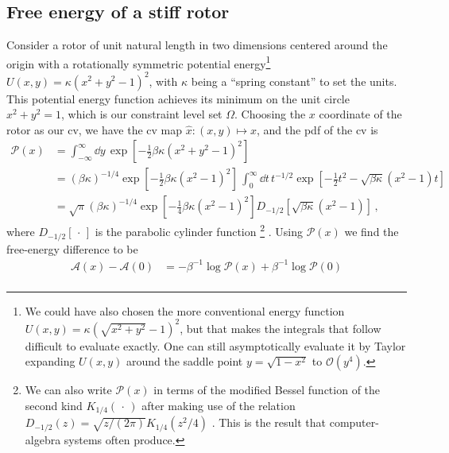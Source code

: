 \begin{subappendices}
\label{sub:subsection name}

\subsection*{Free energy of a stiff rotor}

Consider a rotor of unit natural length in two dimensions centered around the origin with a rotationally symmetric potential energy\footnote{We could have also chosen the more conventional energy function $U(x, y) = \kappa(\sqrt{x^2 + y^2} - 1)^2$, but that makes the integrals that follow difficult to evaluate exactly.  One can still asymptotically evaluate it by Taylor expanding $U(x, y)$ around the saddle point $y = \sqrt{1 - x^2}$ to $\mathcal{O}(y^4)$.} $U(x, y) = \kappa(x^2 + y^2 - 1)^2$, with $\kappa$ being a ``spring constant'' to set the units.
This potential energy function achieves its minimum on the unit circle $x^2 + y^2 = 1$, which is our constraint level set $\Omega$.
Choosing the $x$ coordinate of the rotor as our \ac{cv}, we have the \ac{cv} map $\hat{x}: (x,y) \mapsto x$, and the \ac{pdf} of the \ac{cv} is
%
\begin{equation}
  \begin{aligned}
    \mathscr{P}(x) &= \int_{-\infty}^{\infty} \dd{y}\, \exp\left[-\tfrac{1}{2}\beta\kappa(x^2 + y^2 - 1)^2\right]\\
                             &= (\beta\kappa)^{-1/4}\exp\left[-\tfrac{1}{2}\beta\kappa(x^2 - 1)^2\right]\,\int_{0}^{\infty} \dd{t}\,t^{-1/2}\exp\left[-\tfrac{1}{2}t^2 - \sqrt{\beta\kappa}(x^2 - 1)t\right]\\
                             &= \sqrt{\pi}(\beta\kappa)^{-1/4}\exp\left[-\tfrac{1}{4}\beta\kappa(x^2 - 1)^2\right]D_{-1/2}\left[\sqrt{\beta\kappa}(x^2 - 1)\right]\,,
                             \label{eq:rotor_pdf}
  \end{aligned}
\end{equation}
%
where $D_{-1/2}[\,\cdot\,]$ is the parabolic cylinder function%
\footnote{We can also write $\mathscr{P}(x)$ in terms of the modified Bessel function of the second kind $K_{1/4}(\,\cdot\,)$ after making use of the relation $D_{-1/2}(z) = \sqrt{z/(2\pi)}K_{1/4}(z^2/4)$ \cite[Eq.~12.7.10]{olver2010}.
This is the result that computer-algebra systems often produce.} \cite[Eq.~12.5.1]{olver2010}.
Using $\mathscr{P}(x)$ we find the free-energy difference to be
\begin{equation}
\begin{aligned}\label{eq:rotor_exact_a}
  \mathscr{A}(x) - \mathscr{A}(0) &= -\beta^{-1}\log{\mathscr{P}(x)} +\beta^{-1}\log{\mathscr{P}(0)}\\

\end{aligned}
\end{equation}
\end{subappendices}
